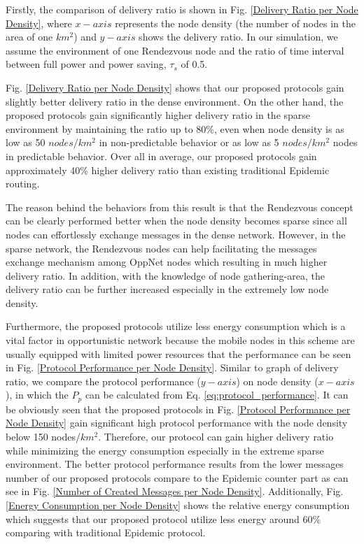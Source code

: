 \documentclass[conference]{IEEEtran}
\begin{document}
Firstly, the comparison of delivery ratio is shown in Fig. \ref{Delivery Ratio per Node Density}, where $x-axis$ represents the node density (the number of nodes in the area of one $km^2$) and $y-axis$ shows the delivery ratio.
In our simulation, we assume the environment of one Rendezvous node and the ratio of time interval between full power and power saving, $\tau_s$ of 0.5.

Fig. \ref{Delivery Ratio per Node Density} shows that our proposed protocols gain slightly better delivery ratio in the dense environment.
On the other hand, the proposed protocols gain significantly higher delivery ratio in the sparse environment by maintaining the ratio up to 80\%, even when node density is as low as 50 $nodes/km^2$ in non-predictable behavior or as low as 5 $nodes/km^2$ nodes in predictable behavior.
Over all in average, our proposed protocols gain approximately 40\% higher delivery ratio than existing traditional Epidemic routing.

The reason behind the behaviors from this result is that the Rendezvous concept can be clearly performed better when the node density becomes sparse since all nodes can effortlessly exchange messages in the dense network.
However, in the sparse network, the Rendezvous nodes can help facilitating the messages exchange mechanism among OppNet nodes which resulting in much higher delivery ratio.
In addition, with the knowledge of node gathering-area, the delivery ratio can be further increased especially in the extremely low node density.

Furthermore, the proposed protocols utilize less energy consumption which is a vital factor in opportunistic network because the mobile nodes in this scheme are usually equipped with limited power resources that the performance can be seen in Fig. \ref{Protocol Performance per Node Density}.
Similar to graph of delivery ratio, we compare the protocol performance ($y-axis$) on node density ($x-axis$), in which the $P_p$ can be calculated from Eq. \ref{eq:protocol_performance}.
It can be obviously seen that the proposed protocols in Fig. \ref{Protocol Performance per Node Density} gain significant high protocol performance with the node density below 150 nodes/$km^2$.
Therefore, our protocol can gain higher delivery ratio while minimizing the energy consumption especially in the extreme sparse environment.
The better protocol performance results from the lower messages number of our proposed protocols compare to the Epidemic counter part as can see in Fig. \ref{Number of Created Messages per Node Density}.
Additionally, Fig. \ref{Energy Consumption per Node Density} shows the relative energy consumption which suggests that our proposed protocol utilize less energy around 60\% comparing with traditional Epidemic protocol.
\end{document}
